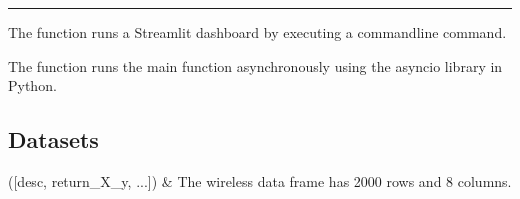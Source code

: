 \documentclass[letterpaper,10pt,english,openany,oneside]{sphinxmanual}
\begin{document}
\bigskip\hrule\bigskip


\begin{fulllineitems}
\label{\detokenize{api_reference/generated/QuadratiK.ui.UI:QuadratiK.ui.UI.main}}
\pysigstartsignatures
{}
\pysigstopsignatures
\sphinxAtStartPar
The  function runs a Streamlit dashboard by executing a command\sphinxhyphen{}line command.

\end{fulllineitems}


\begin{fulllineitems}
\label{\detokenize{api_reference/generated/QuadratiK.ui.UI:QuadratiK.ui.UI.run}}
\pysigstartsignatures
{}
\pysigstopsignatures
\sphinxAtStartPar
The function runs the main function asynchronously using the asyncio library in Python.

\end{fulllineitems}




\subsection{Datasets}
\label{\detokenize{api_reference/index:datasets}}\label{\detokenize{api_reference/index:module-QuadratiK.datasets}}

\begin{savenotes}\sphinxattablestart
\sphinxthistablewithglobalstyle
\sphinxthistablewithnovlinesstyle
\centering
\begin{tabulary}{\linewidth}[t]{}
\sphinxtoprule
\sphinxtableatstartofbodyhook
\sphinxAtStartPar
{\hyperref[\detokenize{api_reference/generated/QuadratiK.datasets.load_wireless_data:QuadratiK.datasets.load_wireless_data}]{}}({[}desc, return\_X\_y, ...{]})
&
\sphinxAtStartPar
The wireless data frame has 2000 rows and 8 columns.
\\
\sphinxbottomrule
\end{tabulary}
\sphinxtableafterendhook\par
\sphinxattableend\end{savenotes}
\end{document}
